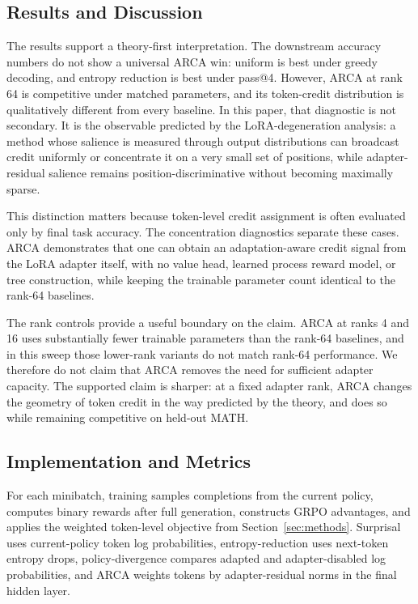 \subsection{Results and Discussion}

The results support a theory-first interpretation. The downstream accuracy
numbers do not show a universal ARCA win: uniform is best under greedy
decoding, and entropy reduction is best under pass@4. However, ARCA at rank
64 is competitive under matched parameters, and its token-credit distribution
is qualitatively different from every baseline. In this paper, that diagnostic
is not secondary. It is the observable predicted by the LoRA-degeneration
analysis: a method whose salience is measured through output distributions
can broadcast credit uniformly or concentrate it on a very small set of
positions, while adapter-residual salience remains position-discriminative
without becoming maximally sparse.

This distinction matters because token-level credit assignment is often
evaluated only by final task accuracy. The concentration diagnostics separate these cases.
ARCA demonstrates that one can obtain an adaptation-aware credit signal from
the LoRA adapter itself, with no value head, learned process reward model, or tree
construction, while keeping the trainable parameter count identical to the
rank-64 baselines.

The rank controls provide a useful boundary on the claim. ARCA at ranks 4 and
16 uses substantially fewer trainable parameters than the rank-64 baselines,
and in this sweep those lower-rank variants do not match rank-64 performance.
We therefore do not claim that ARCA removes the need for sufficient adapter
capacity. The supported claim is sharper: at a fixed adapter rank, ARCA
changes the geometry of token credit in the way predicted by the theory, and
does so while remaining competitive on held-out MATH.

\subsection{Implementation and Metrics}

For each minibatch, training samples completions from the current policy,
computes binary rewards after full generation, constructs GRPO advantages,
and applies the weighted token-level objective from
Section~\ref{sec:methods}. Surprisal uses current-policy token log
probabilities, entropy-reduction uses next-token entropy drops,
policy-divergence compares adapted and adapter-disabled log probabilities,
and ARCA weights tokens by adapter-residual norms in the final hidden layer.

